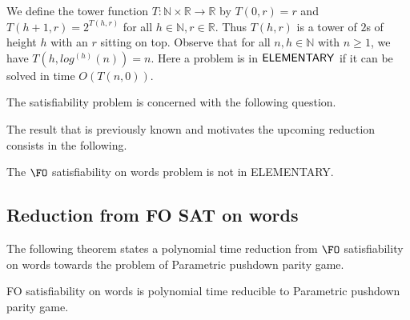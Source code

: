 \documentclass[a4paper,UKenglish,cleveref, autoref, thm-restate]{lipics-v2021}
\newcommand{\problemx}[3]{
	\vspace{0.2cm}
\par\noindent\underline{\sc#1}\par\nobreak\vskip.2\baselineskip
\begingroup\clubpenalty10000\widowpenalty10000
\setbox0\hbox{\bf INPUT:\ }\setbox1\hbox{\bf QUESTION:\ }
\dimen0=\wd0\ifnum\wd1>\dimen0\dimen0=\wd1\fi
\vskip-\parskip\noindent
\hbox to\dimen0{\box0\hfil}\hangindent\dimen0\hangafter1\ignorespaces#2\par
\vskip-\parskip\noindent
\hbox to\dimen0{\box1\hfil}\hangindent\dimen0\hangafter1\ignorespaces#3\par
\endgroup
	\vspace{-0.2cm}
}
\renewcommand{\R}{\mathbb{R}}
\newcommand{\N}{\mathbb{N}}
\begin{document}
We define the tower function $T : \N \times \R \to \R$ by $T(0,r) =r$ and
$T(h+1,r)= 2^{T(h,r)}$ for all $h \in \N, r \in \R$. Thus $T(h,r)$ is a tower of $2$s of height $h$ with an $r$ sitting on top.
Observe that for all $n,h \in \N$ with $n\geq 1$, we have
$T(h, log^{(h)}(n)) = n$.
%
% 
Here a problem is in ${\sf ELEMENTARY}$ if it can be solved in time $O ( T(n, 0) )$.

The satisfiability problem is concerned with the following question.



The result that is previously known and motivates the upcoming reduction consists in the following.


\begin{theorem}\label{FOnonelementary}
The {\sc $\FO$ satisfiability on words} problem is not in {\sc ELEMENTARY}.
\end{theorem}





\subsection{Reduction from FO SAT on words}

The following theorem states a polynomial time reduction from
{\sc $\FO$ satisfiability on words}
towards the problem of 
{\sc Parametric pushdown parity game}.




\begin{samepage}
\begin{theorem}
{\sc FO satisfiability on words} is polynomial time reducible to {\sc Parametric pushdown parity game}.
\end{theorem}
\end{samepage}
\end{document}
